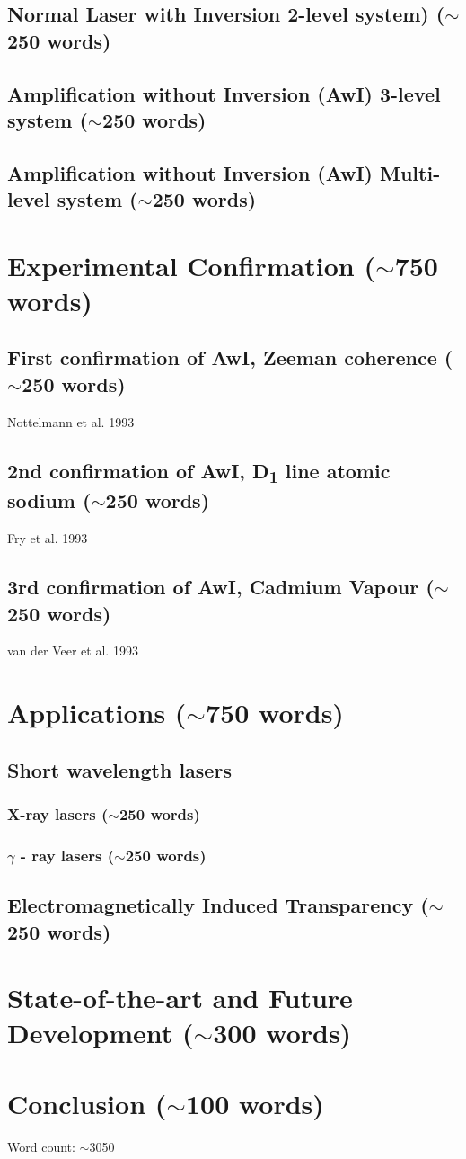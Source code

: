 \documentclass{article}
\begin{document}
\subsection{Normal Laser with Inversion 2-level system) ($\sim$250 words)}
\subsection{Amplification without Inversion (AwI) 3-level system ($\sim$250 words)}
\subsection{Amplification without Inversion (AwI) Multi-level system ($\sim$250 words)}

\section{Experimental Confirmation ($\sim$750 words)}
\subsection{First confirmation of AwI, Zeeman coherence ($\sim$250 words)}
Nottelmann et al. 1993 \cite{Nottelmann1993}
\subsection{2nd confirmation of AwI, D\textsubscript{1} line atomic sodium ($\sim$250 words)}
Fry et al. 1993 \cite{PhysRevLett.70.3235}
\subsection{3rd confirmation of AwI, Cadmium Vapour ($\sim$250 words)}
van der Veer et al. 1993 \cite{PhysRevLett.70.3243}

\section{Applications ($\sim$750 words)}
\subsection{Short wavelength lasers}
\subsubsection{X-ray lasers ($\sim$250 words)}
\subsubsection{$\gamma$ - ray lasers ($\sim$250 words)}
\subsection{Electromagnetically Induced Transparency ($\sim$250 words)}

\section{State-of-the-art and Future Development ($\sim$300 words)}

\section{Conclusion ($\sim$100 words)}

Word count: $\sim$3050
\end{document}
